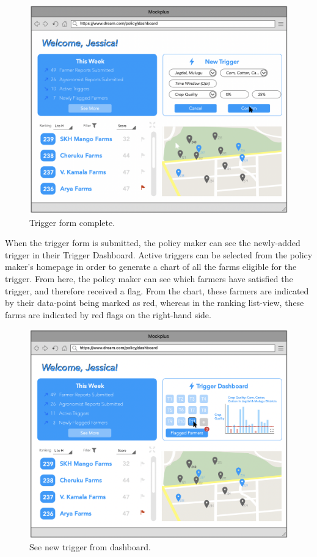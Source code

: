 \begin{figure}[H]
\centering
\includegraphics[scale=0.4]{../images_diagrams/mock_ups/dd/Trig05_SetUpDone.png}
\caption{\label{fig:mockpolicy_formComplete}Trigger form complete.}
\end{figure}

\begin{flushleft}
When the trigger form is submitted, the policy maker can see the newly-added trigger in their Trigger Dashboard. Active triggers can be selected from the policy maker's homepage in order to generate a chart of all the farms eligible for the trigger. From here, the policy maker can see which farmers have satisfied the trigger, and therefore received a flag. From the chart, these farmers are indicated by their data-point being marked as red, whereas in the ranking list-view, these farms are indicated by red flags on the right-hand side.
\end{flushleft}


\begin{figure}[H]
\centering
\includegraphics[scale=0.4]{../images_diagrams/mock_ups/dd/Trig06_NewTrigAdded.png}
\caption{\label{fig:mockpolicy_trigEntered}See new trigger from dashboard.}
\end{figure}


